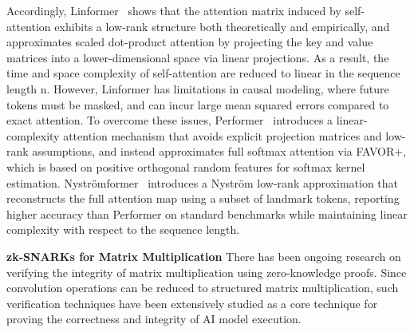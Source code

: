 \documentclass[sigconf,anonymous,review,balance=false]{acmart}
\newcommand{\rev}[1]{{\color{magenta}#1}}
\begin{document}
Accordingly, Linformer~\cite{Linformer} shows that the attention matrix induced by self-attention exhibits a low-rank structure both theoretically and empirically, and approximates scaled dot-product attention by projecting the key and value matrices into a lower-dimensional space via linear projections. As a result, the time and space complexity of self-attention are reduced to linear in the sequence length n.
However, Linformer has limitations in causal modeling, where future tokens must be masked, and can incur large mean squared errors compared to exact attention. To overcome these issues, Performer~\cite{Performer} introduces a linear-complexity attention mechanism that avoids explicit projection matrices and low-rank assumptions, and instead approximates full softmax attention via FAVOR+, which is based on positive orthogonal random features for softmax kernel estimation.
Nyströmformer~\cite{Nystromformer} introduces a Nyström low-rank approximation that reconstructs the full attention map using a subset of landmark tokens, \rev{reporting higher accuracy than Performer on standard benchmarks} while maintaining linear complexity with respect to the sequence length.

\textbf{zk-SNARKs for Matrix Multiplication}
There has been ongoing research on verifying the integrity of matrix multiplication using zero-knowledge proofs. Since convolution operations can be reduced to structured matrix multiplication, such verification techniques have been extensively studied as a core technique for proving the correctness and integrity of AI model execution.
\end{document}
